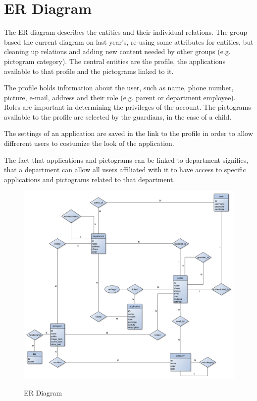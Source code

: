 \section{ER Diagram}
The ER diagram describes the entities and their individual relations. The group based the current diagram on last year's, re-using some attributes for entities, but cleaning up relations and adding new content needed by other groups (e.g. pictogram category). The central entities are the profile, the applications available to that profile and the pictograms linked to it.%

The profile holds information about the user, such as name, phone number, picture, e-mail, address and their role (e.g. parent or department employee). Roles are important in determining the privileges of the account. The pictograms available to the profile are selected by the guardians, in the case of a child.

The settings of an application are saved in the link to the profile in order to allow diffrerent users to costumize the look of the application.

The fact that applications and pictograms can be linked to department signifies, that a department can allow all users affiliated with it to have access to specific applications and pictograms related to that department.

\begin{figure}[h]
\includegraphics[width=\textwidth]{img/ER_diagram.pdf}
\label{fig:erdiagram}
\caption{ER Diagram}
\end{figure}